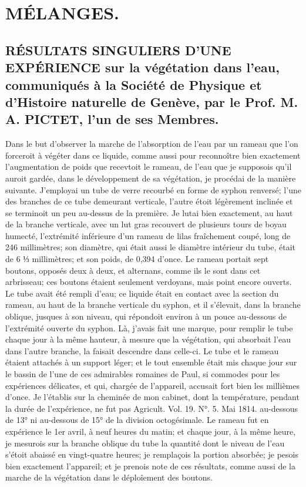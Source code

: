 \setcounter{page}{176}
\chapter{MÉLANGES.}
\section{RÉSULTATS SINGULIERS D'UNE EXPÉRIENCE sur la végétation dans l'eau, communiqués à la Société de Physique et d'Histoire naturelle de Genève, par le Prof. M. A. PICTET, l'un de ses Membres.}
Dans le but d'observer la marche de l'absorption de l'eau par un rameau que l'on forceroit à végéter dans ce liquide, comme aussi pour reconnoître bien exactement l'augmentation de poids que recevtoit le rameau, de l'eau que je supposois qu'il auroit gardée, dans le développement de sa végétation, je procédai de la manière suivante.
J'employai un tube de verre recourbé en forme de syphon renversé; l'une des branches de ce tube demeurant verticale, l'autre étoit légèrement inclinée et se terminoit un peu au-dessus de la première. Je lutai bien exactement, au haut de la branche verticale, avec un lut gras recouvert de plusieurs tours de boyau humecté, l'extrémité inférieure d'un\setcounter{page}{177} rameau de lilas fraîchement coupé, long de 246 millimètres; son diamètre, qui était aussi le diamètre intérieur du tube, était de 6 ⅓ millimètres; et son poids, de 0,394 d'once. Le rameau portait sept boutons, opposés deux à deux, et alternans, comme ils le sont dans cet arbrisseau; ces boutons étaient seulement verdoyans, mais point encore ouverts. Le tube avait été rempli d'eau; ce liquide était en contact avec la section du rameau, au haut de la branche verticale du syphon, et il s'élevait, dans la branche oblique, jusques à son niveau, qui répondoit environ à un pouce au-dessous de l'extrémité ouverte du syphon. Là, j'avais fait une marque, pour remplir le tube chaque jour à la même hauteur, à mesure que la végétation, qui absorbait l'eau dans l'autre branche, la faisait descendre dans celle-ci. Le tube et le rameau étaient attachés à un support léger; et le tout ensemble était mis chaque jour sur le bassin de l'une de ces admirables romaines de Paul, si commodes pour les expériences délicates, et qui, chargée de l'appareil, accusait fort bien les millièmes d'once. Je l'établis sur la cheminée de mon cabinet, dont la température, pendant la durée de l'expérience, ne fut pas Agricult. Vol. 19. N°. 5. Mai 1814.\setcounter{page}{178} au-dessous de 13° ni au-dessous de 15° de la division octogésimale. Le rameau fut en expérience le 1er avril, à neuf heures du matin; et chaque jour, à la même heure, je mesurois sur la branche oblique du tube la quantité dont le niveau de l'eau s'étoit abaissé en vingt-quatre heures; je remplaçois la portion absorbée; je pesois bien exactement l'appareil; et je prenois note de ces résultats, comme aussi de la marche de la végétation dans le déploîement des boutons.
